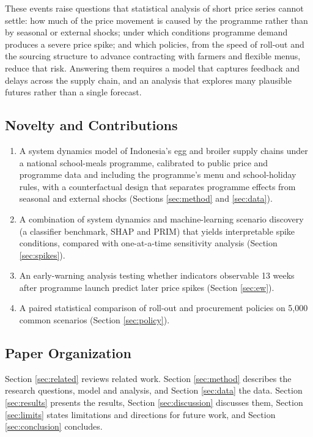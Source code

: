 \documentclass[10pt,twocolumn,a4paper]{article}
\begin{document}
These events raise questions that statistical analysis of short price series cannot settle: how much of the price movement is caused by the programme rather than by seasonal or external shocks; under which conditions programme demand produces a severe price spike; and which policies, from the speed of roll-out and the sourcing structure to advance contracting with farmers and flexible menus, reduce that risk. Answering them requires a model that captures feedback and delays across the supply chain, and an analysis that explores many plausible futures rather than a single forecast.


\subsection{Novelty and Contributions}

\begin{enumerate}\item A system dynamics model of Indonesia's egg and broiler supply chains under a national school-meals programme, calibrated to public price and programme data and including the programme's menu and school-holiday rules, with a counterfactual design that separates programme effects from seasonal and external shocks (Sections \ref{sec:method} and \ref{sec:data}). \item A combination of system dynamics and machine-learning scenario discovery (a classifier benchmark, SHAP and PRIM) that yields interpretable spike conditions, compared with one-at-a-time sensitivity analysis (Section \ref{sec:spikes}). \item An early-warning analysis testing whether indicators observable 13 weeks after programme launch predict later price spikes (Section \ref{sec:ew}). \item A paired statistical comparison of roll-out and procurement policies on 5,000 common scenarios (Section \ref{sec:policy}). \end{enumerate}

\subsection{Paper Organization}

Section \ref{sec:related} reviews related work. Section \ref{sec:method} describes the research questions, model and analysis, and Section \ref{sec:data} the data. Section \ref{sec:results} presents the results, Section \ref{sec:discussion} discusses them, Section \ref{sec:limits} states limitations and directions for future work, and Section \ref{sec:conclusion} concludes.
\end{document}
